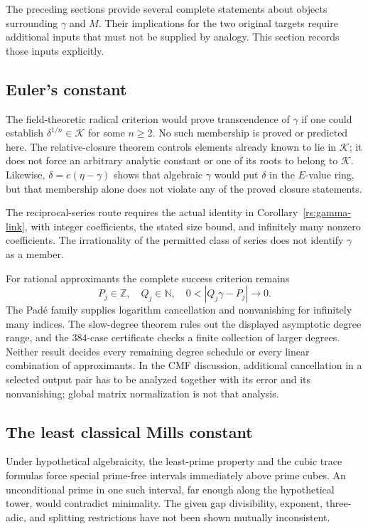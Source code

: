 \documentclass[11pt,a4paper]{article}
\numberwithin{equation}{section}
\theoremstyle{definition}
\theoremstyle{remark}
\newcommand{\Z}{\mathbb Z}
\newcommand{\N}{\mathbb N}
\newcommand{\K}{\mathcal K}
\begin{document}
The preceding sections provide several complete statements about objects
surrounding $\gamma$ and $M$.  Their implications for the two original
targets require additional inputs that must not be supplied by analogy.
This section records those inputs explicitly.

\subsection{Euler's constant}

The field-theoretic radical criterion would prove transcendence of
$\gamma$ if one could establish $\delta^{1/n}\in\K$ for some $n\ge2$.
No such membership is proved or predicted here.  The relative-closure
theorem controls elements already known to lie in $\K$; it does not force
an arbitrary analytic constant or one of its roots to belong to $\K$.
Likewise, $\delta=e(\eta-\gamma)$ shows that algebraic $\gamma$ would put
$\delta$ in the $E$-value ring, but that membership alone does not violate
any of the proved closure statements.

The reciprocal-series route requires the actual identity in
Corollary~\ref{rs:gamma-link}, with integer coefficients, the stated
size bound, and infinitely many nonzero coefficients.  The irrationality
of the permitted class of series does not identify $\gamma$ as a member.

For rational approximants the complete success criterion remains
\[
 P_j\in\Z,\quad Q_j\in\N,\quad
 0<|Q_j\gamma-P_j|\longrightarrow0.
\]
The Pad\'e family supplies logarithm cancellation and nonvanishing for
infinitely many indices.  The slow-degree theorem rules out the displayed
asymptotic degree range, and the 384-case certificate checks a finite
collection of larger degrees.  Neither result decides every remaining
degree schedule or every linear combination of approximants.  In the
CMF discussion, additional cancellation in a selected output pair has to
be analyzed together with its error and its nonvanishing; global matrix
normalization is not that analysis.

\subsection{The least classical Mills constant}

Under hypothetical algebraicity, the least-prime property and the cubic
trace formulas force special prime-free intervals immediately above
prime cubes.  An unconditional prime in one such interval, far enough
along the hypothetical tower, would contradict minimality.  The given
gap divisibility, exponent, three-adic, and splitting restrictions have
not been shown mutually inconsistent.
\end{document}

